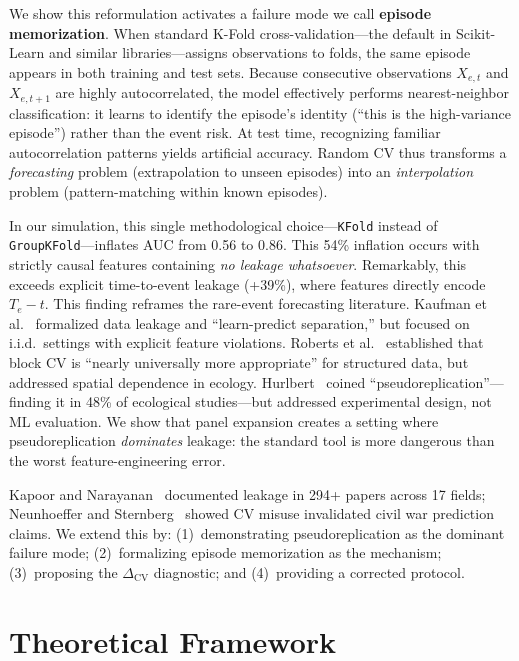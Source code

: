 \documentclass[acmsmall,nonacm]{acmart}
\newcommand{\1}{\mathbbm{1}}
\newcommand{\DeltaCV}{\Delta_{\text{CV}}}
\begin{document}
We show this reformulation activates a failure mode we call \textbf{episode memorization}. When standard K-Fold cross-validation---the default in Scikit-Learn and similar libraries---assigns observations to folds, the same episode appears in both training and test sets. Because consecutive observations $X_{e,t}$ and $X_{e,t+1}$ are highly autocorrelated, the model effectively performs nearest-neighbor classification: it learns to identify the episode's identity (``this is the high-variance episode'') rather than the event risk. At test time, recognizing familiar autocorrelation patterns yields artificial accuracy. Random CV thus transforms a \textit{forecasting} problem (extrapolation to unseen episodes) into an \textit{interpolation} problem (pattern-matching within known episodes).

In our simulation, this single methodological choice---\texttt{KFold} instead of \texttt{GroupKFold}---inflates AUC from 0.56 to 0.86. This 54\% inflation occurs with strictly causal features containing \textit{no leakage whatsoever}. Remarkably, this exceeds explicit time-to-event leakage (+39\%), where features directly encode $T_e - t$. This finding reframes the rare-event forecasting literature. Kaufman et al.~\cite{kaufman2012} formalized data leakage and ``learn-predict separation,'' but focused on i.i.d.\ settings with explicit feature violations. Roberts et al.~\cite{roberts2017} established that block CV is ``nearly universally more appropriate'' for structured data, but addressed spatial dependence in ecology. Hurlbert~\cite{hurlbert1984} coined ``pseudoreplication''---finding it in 48\% of ecological studies---but addressed experimental design, not ML evaluation. We show that panel expansion creates a setting where pseudoreplication \textit{dominates} leakage: the standard tool is more dangerous than the worst feature-engineering error.

Kapoor and Narayanan~\cite{kapoor2023} documented leakage in 294+ papers across 17 fields; Neunhoeffer and Sternberg~\cite{neunhoeffer2019} showed CV misuse invalidated civil war prediction claims. We extend this by: (1)~demonstrating pseudoreplication as the dominant failure mode; (2)~formalizing episode memorization as the mechanism; (3)~proposing the $\DeltaCV$ diagnostic; and (4)~providing a corrected protocol.

\section{Theoretical Framework}\label{sec:theory}
\end{document}
